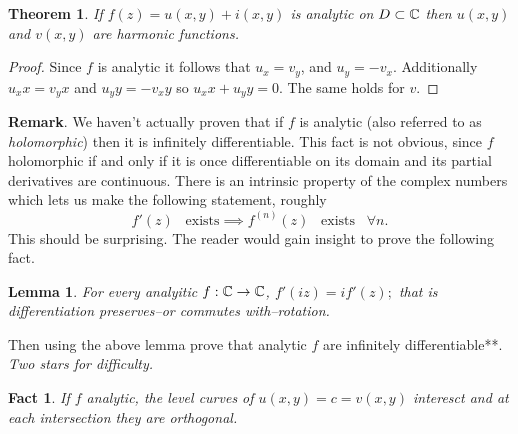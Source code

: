 \documentclass[letter]{article}
\newtheorem{theorem}{Theorem}
\newtheorem{lemma}{Lemma}
\newtheorem{fact}{Fact}
\def\complex{{\mathbb C}\/}
\begin{document}
\begin{theorem}
	If $f(z) = u(x,y) +i(x,y)$ is analytic on $D \subset \complex$ then 
	$u(x,y)$ and $v(x,y)$ are harmonic functions.
\end{theorem}
\begin{proof}
	Since $f$ is analytic it follows that $u_x = v_y$, and $u_y = -v_x$. Additionally  $u_xx = v_yx$ and $u_yy = -v_xy$ so $u_xx + u_yy = 0$. The same holds for $v$.
\end{proof}
\noindent \textbf{Remark}. We haven't actually proven that if $f$ is analytic (also referred to as \emph{holomorphic}) then it is infinitely differentiable. This fact is not obvious, since $f$ holomorphic if and only if it is once differentiable on its domain and its partial derivatives are continuous. There is an intrinsic property of the complex numbers which lets us make the following statement, roughly
\begin{equation*}
	f'(z)\; \;\; \mathrm{ exists} \implies f^{(n)}(z)\; \;\; \mathrm{ exists }\;\;\;\forall n.
\end{equation*}
This should be surprising. The reader would gain insight to prove the following fact.
\begin{lemma}
	 For every analyitic $f: \complex \to \complex$, $f'(iz) = if'(z);$ that is differentiation preserves--or \emph{commutes with}--rotation.  	
\end{lemma}
\noindent Then using the above lemma prove that analytic $f$ are infinitely differentiable**. \emph{Two stars for difficulty.}
\begin{fact}
	If $f$ analytic, the level curves of $u(x,y) = c = v(x,y)$ interesct and at each intersection they are orthogonal.
\end{fact}
\end{document}
